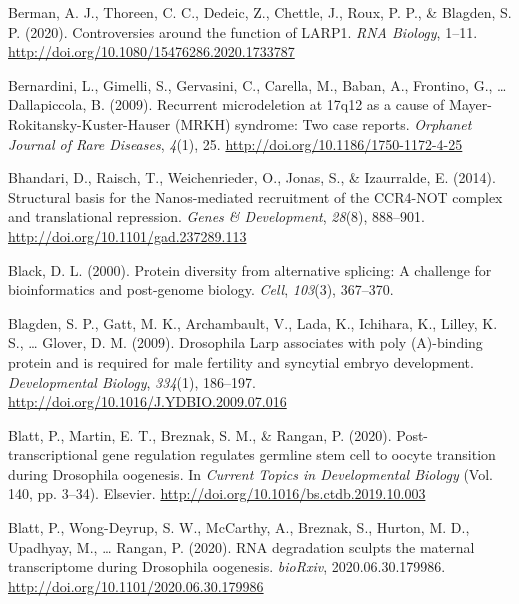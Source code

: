 \documentclass[12pt,oneside]{reedthesis}
\newlength{\cslhangindent}
\newenvironment{cslreferences}%
  {\setlength{\parindent}{0pt}%
  \everypar{\setlength{\hangindent}{\cslhangindent}}\ignorespaces}%
  {\par}
\begin{document}
\begin{cslreferences}
\leavevmode\hypertarget{ref-bermanControversiesFunctionLARP12020}{}%
Berman, A. J., Thoreen, C. C., Dedeic, Z., Chettle, J., Roux, P. P., \& Blagden, S. P. (2020). Controversies around the function of LARP1. \emph{RNA Biology}, 1--11. \url{http://doi.org/10.1080/15476286.2020.1733787}

\leavevmode\hypertarget{ref-bernardiniRecurrentMicrodeletion17q122009}{}%
Bernardini, L., Gimelli, S., Gervasini, C., Carella, M., Baban, A., Frontino, G., \ldots{} Dallapiccola, B. (2009). Recurrent microdeletion at 17q12 as a cause of Mayer-Rokitansky-Kuster-Hauser (MRKH) syndrome: Two case reports. \emph{Orphanet Journal of Rare Diseases}, \emph{4}(1), 25. \url{http://doi.org/10.1186/1750-1172-4-25}

\leavevmode\hypertarget{ref-Bhandari2014h}{}%
Bhandari, D., Raisch, T., Weichenrieder, O., Jonas, S., \& Izaurralde, E. (2014). Structural basis for the Nanos-mediated recruitment of the CCR4-NOT complex and translational repression. \emph{Genes \& Development}, \emph{28}(8), 888--901. \url{http://doi.org/10.1101/gad.237289.113}

\leavevmode\hypertarget{ref-Black2000}{}%
Black, D. L. (2000). Protein diversity from alternative splicing: A challenge for bioinformatics and post-genome biology. \emph{Cell}, \emph{103}(3), 367--370.

\leavevmode\hypertarget{ref-Blagden2009f}{}%
Blagden, S. P., Gatt, M. K., Archambault, V., Lada, K., Ichihara, K., Lilley, K. S., \ldots{} Glover, D. M. (2009). Drosophila Larp associates with poly (A)-binding protein and is required for male fertility and syncytial embryo development. \emph{Developmental Biology}, \emph{334}(1), 186--197. \url{http://doi.org/10.1016/J.YDBIO.2009.07.016}

\leavevmode\hypertarget{ref-blattPosttranscriptionalGeneRegulation2020}{}%
Blatt, P., Martin, E. T., Breznak, S. M., \& Rangan, P. (2020). Post-transcriptional gene regulation regulates germline stem cell to oocyte transition during Drosophila oogenesis. In \emph{Current Topics in Developmental Biology} (Vol. 140, pp. 3--34). Elsevier. \url{http://doi.org/10.1016/bs.ctdb.2019.10.003}

\leavevmode\hypertarget{ref-blattRNADegradationSculpts2020}{}%
Blatt, P., Wong-Deyrup, S. W., McCarthy, A., Breznak, S., Hurton, M. D., Upadhyay, M., \ldots{} Rangan, P. (2020). RNA degradation sculpts the maternal transcriptome during Drosophila oogenesis. \emph{bioRxiv}, 2020.06.30.179986. \url{http://doi.org/10.1101/2020.06.30.179986}


\end{cslreferences}
\end{document}
